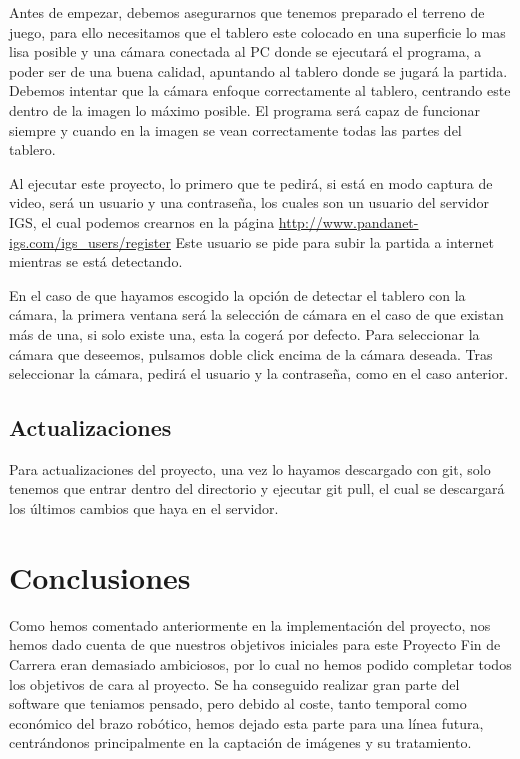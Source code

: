 \documentclass[12pt,a4paper]{report}
\begin{document}
Antes de empezar, debemos asegurarnos que tenemos preparado el terreno de juego,
para ello necesitamos que el tablero este colocado en una superficie lo mas lisa
posible y una cámara conectada al PC donde se ejecutará el programa, a poder
ser de una buena calidad, apuntando al tablero donde se jugará la partida.
Debemos intentar que la cámara enfoque correctamente al tablero, centrando este
dentro de la imagen lo máximo posible. El programa será capaz de funcionar
siempre y cuando en la imagen se vean correctamente todas las partes del
tablero.

Al ejecutar este proyecto, lo primero que te pedirá, si está en modo captura de
video, será un usuario y una contraseña, los cuales son un usuario del servidor
IGS, el cual podemos crearnos en la página 
\url{http://www.pandanet-igs.com/igs_users/register}
Este usuario se pide para subir la partida a internet mientras se está
detectando. 

En el caso de que hayamos escogido la opción de detectar el tablero con la
cámara, la primera ventana será la selección de cámara en el caso de que existan
más de una, si solo existe una, esta la cogerá por defecto. Para seleccionar la
cámara que deseemos, pulsamos doble click encima de la cámara deseada.  Tras
seleccionar la cámara, pedirá el usuario y la contraseña, como en el caso
anterior. 


\section{Actualizaciones}

Para actualizaciones del proyecto, una vez lo hayamos descargado con git, solo
tenemos que entrar dentro del directorio y ejecutar git pull, el cual se
descargará los últimos cambios que haya en el servidor. 


\chapter{Conclusiones}

Como hemos comentado anteriormente en la implementación del proyecto, nos hemos
dado cuenta de que nuestros objetivos iniciales para este Proyecto Fin de
Carrera eran demasiado ambiciosos, por lo cual no hemos podido completar todos
los objetivos de cara al proyecto. Se ha conseguido realizar gran parte del
software que teniamos pensado, pero debido al coste, tanto temporal como
económico del brazo robótico, hemos dejado esta parte para una línea futura,
centrándonos principalmente en la captación de imágenes y su tratamiento.
\end{document}
